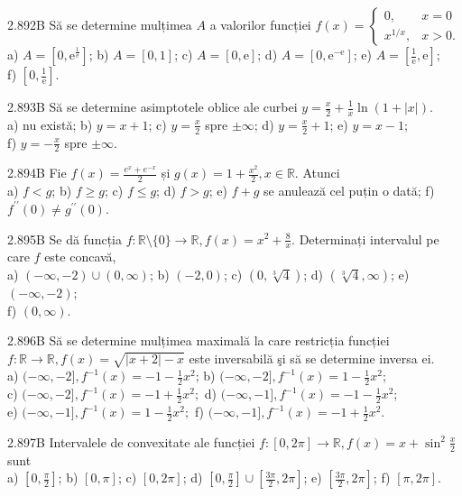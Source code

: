 \documentclass[11pt]{article}
\begin{document}
2.892B Să se determine mulțimea $A$ a valorilor funcției $f(x)= \begin{cases}0, & x=0 \\ x^{1 / x}, & x>0 .\end{cases}$\\ a) $A=\left[0, \mathrm{e}^{\frac{1}{\mathrm{e}}}\right]$; b) $A=[0,1]$; c) $A=[0, \mathrm{e}]$; d) $A=\left[0, \mathrm{e}^{-\mathrm{e}}\right]$; e) $A = \left[ \frac{1}{\mathrm{e}}, \mathrm{e} \right]$;\\ f) $\left[0, \frac{1}{\mathrm{e}}\right]$.

2.893B Să se determine asimptotele oblice ale curbei $y=\frac{x}{2}+\frac{1}{x} \ln (1+|x|)$.\\ a) nu există; b) $y=x+1$; c) $y=\frac{x}{2}$ spre $\pm \infty$; d) $y=\frac{x}{2}+1$; e) $y=x-1$;\\ f) $y=-\frac{x}{2}$ spre $\pm \infty$.

2.894B Fie $f(x)=\frac{e^{x}+e^{-x}}{2}$ și $g(x)=1+\frac{x^{2}}{2}, x \in \mathbb{R}$. Atunci\\ a) $f<g$; b) $f \geq g$; c) $f \leq g$; d) $f>g$; e) $f+g$ se anulează cel puțin o dată; f) $f^{\prime \prime}(0) \neq g^{\prime \prime}(0)$.

2.895B Se dă funcția $f: \mathbb{R} \setminus\{0\} \rightarrow \mathbb{R}, f(x)=x^{2}+\frac{8}{x}$. Determinați intervalul pe care $f$ este concavă,\\ a) $(-\infty,-2) \cup(0, \infty)$; b) $(-2,0)$; c) $(0, \sqrt[3]{4})$; d) $(\sqrt[3]{4}, \infty)$; e) $(-\infty,-2)$;\\ f) $(0, \infty)$.

2.896B Să se determine mulțimea maximală la care restricția funcției $f: \mathbb{R} \rightarrow \mathbb{R}, f(x)=\sqrt{|x+2|-x}$ este inversabilă şi să se determine inversa ei.\\ a) $(-\infty,-2], f^{-1}(x)=-1-\frac{1}{2} x^{2}$; b) $(-\infty,-2], f^{-1}(x)=1-\frac{1}{2} x^{2}$;\\ c) $(-\infty,-2], f^{-1}(x)=-1+\frac{1}{2} x^{2} ;$ d) $(-\infty,-1], f^{-1}(x)=-1-\frac{1}{2} x^{2}$;\\ e) $(-\infty,-1], f^{-1}(x)=1-\frac{1}{2} x^{2} ;$ f) $(-\infty,-1], f^{-1}(x)=-1+\frac{1}{2} x^{2}$. 

2.897B Intervalele de convexitate ale funcției $f:[0,2 \pi] \rightarrow \mathbb{R}, f(x)=x+\sin ^{2} \frac{x}{2}$ sunt\\ a) $\left[0, \frac{\pi}{2}\right]$; b) $[0, \pi]$; c) $[0,2 \pi]$; d) $\left[0, \frac{\pi}{2}\right] \cup\left[\frac{3 \pi}{2}, 2 \pi\right]$; e) $\left[\frac{3 \pi}{2}, 2 \pi\right]$; f) $[\pi, 2 \pi]$.
\end{document}
